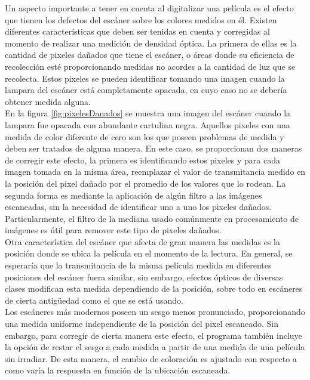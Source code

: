 Un aspecto importante a tener en cuenta al digitalizar una película es el efecto que tienen los defectos del escáner sobre los colores medidos en él. Existen diferentes características que deben ser tenidas en cuenta y corregidas al momento de realizar una medición de densidad óptica. La primera de ellas es la cantidad de pixeles dañados que tiene el escáner, o áreas donde su eficiencia de recolección esté proporcionando medidas no acordes a la cantidad de luz que se recolecta. Estos pixeles se pueden identificar tomando una imagen cuando la lampara del escáner está completamente opacada, en cuyo caso no se debería obtener medida alguna.  \\

En la figura \ref{fig:pixelesDanados} se muestra una imagen del escáner cuando la lampara fue opacada con abundante cartulina negra. Aquellos pixeles con una medida de color diferente de cero son los que poseen problemas de medida y deben ser tratados de alguna manera. En este caso, se proporcionan dos maneras de corregir este efecto, la primera es identificando estos pixeles y para cada imagen tomada en la misma área, reemplazar el valor de transmitancia medido en la posición del pixel dañado por el promedio de los valores que lo rodean. La segunda forma es mediante la aplicación de algún filtro a las imágenes escaneadas, sin la necesidad de identificar uno a uno los pixeles dañados. Particularmente, el filtro de la mediana usado comúnmente en procesamiento de imágenes es útil para remover este tipo de pixeles dañados.\\ 

Otra característica del escáner que afecta de gran manera las medidas es la posición donde se ubica la película en el momento de la lectura. En general, se esperaría que la transmitancia de la misma película medida en diferentes posiciones del escáner fuera similar, sin embargo, efectos ópticos de diversas clases modifican esta medida dependiendo de la posición, sobre todo en escáneres de cierta antigüedad como el que se está usando.\\

Los escáneres más modernos poseen un sesgo menos pronunciado, proporcionando una medida uniforme independiente de la posición del pixel escaneado. Sin embargo, para corregir de cierta manera este efecto, el programa también incluye la opción de restar el sesgo a cada medida a partir de una medida de una película sin irradiar. De esta manera, el cambio de coloración es ajustado con respecto a como varía la respuesta en función de la ubicación escaneada. \\


